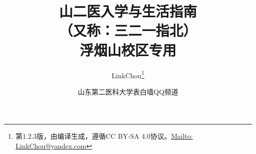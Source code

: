 \documentclass[a4paper,twoside,onecolumn,12pt]{ctexrep}
\renewcommand{\thefootnote}{\fnsymbol{footnote}}
\begin{document}


\title{\Huge{\textbf{山二医入学与生活指南}\\\normalsize{（又称：三二一指北）}\\\large{浮烟山校区专用}}}
\bigbreak
\author{LinkChou\thanks{第1.2.3版，由\textit{\LaTeXe}编译生成，遵循CC BY-SA 4.0协议。\uline{\href{Mailto:LinkChou@yandex.com}{Mailto: LinkChou@yandex.com}}}\and 山东第二医科大学表白墙QQ频道}
\date{\DTMnow}
\maketitle

\setlength{\parskip}{0.8em minus 5pt}
\renewcommand{\thefootnote}{\arabic{footnote}}

\tableofcontents
\newpage















\end{document}
